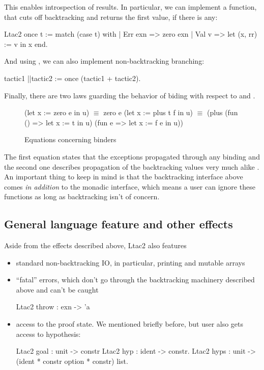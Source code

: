 This enables introspection of results.
In particular, we can implement a function, that cuts off backtracking and returns the first value, if there is any:
\begin{coq}
Ltac2 once t := match (case t) with
  | Err exn => zero exn
  | Val v => let (x, rr) := v in x
  end.
\end{coq}

And using , we can also implement non-backtracking branching:
\begin{coq}
tactic1 ||tactic2 := once (tactic1 + tactic2).
\end{coq}

Finally, there are two laws guarding the behavior of biding with respect to  and .
\begin{figure}[H]
\begin{coq}
(let x := zero e in u) $\equiv$ zero e
(let x := plus t f in u) $\equiv$ (plus (fun () => let x := t in u)
                                 (fun e => let x := f e in u))
\end{coq}
\caption{Equations concerning binders}
\label{fig:let_eq}
\end{figure}

The first equation states that the exceptions propagated through any binding and the second one describes propagation of the backtracking values very much alike .
An important thing to keep in mind is that the backtracking interface above comes \emph{in addition} to the monadic interface, which means a user can ignore these functions as long as backtracking isn't of concern.

\subsection{General language feature and other effects}
\label{sec:other-effects}

Aside from the effects described above, Ltac2 also features
\begin{itemize}
\item standard non-backtracking IO, in particular, printing and mutable arrays
\item ``fatal'' errors, which don't go through the backtracking machinery described above and can't be caught
  \begin{coq}
  Ltac2 throw : exn -> 'a
  \end{coq}\vspace{-0.7em}
\item access to the proof state.
  We mentioned  briefly before, but user also gets access to hypothesis:
  \begin{coq}
  Ltac2 goal : unit -> constr
  Ltac2 hyp : ident -> constr.
  Ltac2 hyps : unit -> (ident * constr option * constr) list.
  \end{coq}\vspace{-0.7em}
\end{itemize}

